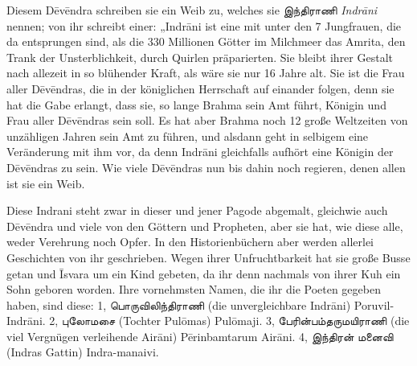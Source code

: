 \documentclass{article}
\newcommand{\TamilText}[1]{\texttamil{#1}}
\newcommand{\tam}[1]{\TamilText{#1}}
\begin{document}
Diesem D\={e}v\={e}ndra schreiben sie ein Weib zu, welches sie \tam{இந்திராணி} \emph{Indr\={a}ni} nennen; von ihr schreibt einer: „Indr\={a}ni ist eine mit unter den 7 Jungfrauen, die da entsprungen sind, als die 330 Millionen Götter im Milchmeer das Amrita, den Trank der Unsterblichkeit, durch Quirlen präparierten. Sie bleibt ihrer Gestalt nach allezeit in so blühender Kraft, als wäre sie nur 16 Jahre alt. Sie ist die Frau aller D\={e}v\={e}ndras, die in der königlichen Herrschaft auf einander folgen, denn sie hat die Gabe erlangt, dass sie, so lange Brahma sein Amt führt, Königin und Frau aller D\={e}v\={e}ndras sein soll. Es hat aber Brahma noch 12 große Weltzeiten von unzähligen Jahren sein Amt zu führen, und alsdann geht in selbigem eine Veränderung mit ihm vor, da denn Indr\={a}ni gleichfalls aufhört eine Königin der D\={e}v\={e}ndras zu sein. Wie viele D\={e}v\={e}ndras nun bis dahin noch regieren, denen allen ist sie ein Weib.

Diese Indrani steht zwar in dieser und jener Pagode abgemalt, gleichwie auch D\={e}v\={e}ndra und viele von den Göttern und Propheten, aber sie hat, wie diese alle, weder Verehrung noch Opfer. In den Historienbüchern aber werden allerlei Geschichten von ihr geschrieben. Wegen ihrer Unfruchtbarkeit hat sie große Busse getan und \={I}svara um ein Kind gebeten, da ihr denn nachmals von ihrer Kuh ein Sohn geboren worden. Ihre vornehmsten Namen, die ihr die Poeten gegeben haben, sind diese: 1, \tam{பொருவிலிந்திராணி} (die unvergleichbare Indr\={a}ni) Poruvil-Indr\={a}ni. 2, \tam{புலோமசை} (Tochter Pul\={o}mas) Pul\={o}maji. 3, \tam{பேரின்பம்தருமயிராணி} (die viel Vergnügen verleihende Air\={a}ni) P\={e}rinbamtarum Air\={a}ni. 4, \tam{இந்திரன்} \tam{மனைவி} (Indras Gattin) Indra-manaivi.
\end{document}
